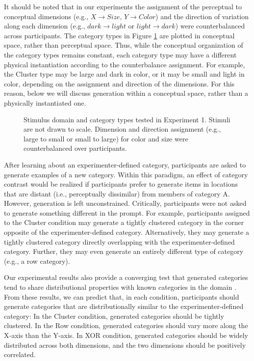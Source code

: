 \documentclass[12pt]{article}
\newcommand\inputpgf[2]{{
\let\pgfimageWithoutPath\pgfimage
\renewcommand{\pgfimage}[2][]{\pgfimageWithoutPath[##1]{#1/##2}}

}}
\begin{document}
\begin{flushleft}
It should be noted that in our experiments the assignment of the perceptual
to conceptual dimensions (e.g., $X \rightarrow Size$, $Y \rightarrow Color$) and the direction of variation along each dimension (e.g., $dark
\rightarrow light$ or $light \rightarrow dark$) were counterbalanced across
participants. The category types in Figure \ref{fig:e1-conditions} are plotted
in conceptual space, rather than perceptual space. Thus, while the
conceptual organization of the category types remains constant, each category
type may have a different physical instantiation according to the counterbalance
assignment. For example, the Cluster type may be large and dark in color, or it
may be small and light in color, depending on the assignment and direction of
the dimensions. For this reason, below we will discuss generation within a
conceptual space, rather than a physically instantiated one.

\begin{figure}
    \begin{center} \inputpgf{figs/}{e1-conditions.pgf}
    \caption{Stimulus domain and category types tested in Experiment 1. Stimuli
are not drawn to scale. Dimension and direction assignment (e.g., large to small or small to large) for color and size were counterbalanced over participants.}
    \label{fig:e1-conditions}
    \end{center}
\end{figure}

After learning about an experimenter-defined category, participants are asked to
generate examples of a new category. Within this paradigm, an effect of category
contrast would be realized if participants prefer to generate items in locations
that are distant (i.e., perceptually dissimilar) from members of category A.
However, generation is left unconstrained. Critically, participants were not
asked to generate something different in the prompt. For example, participants
assigned to the Cluster condition may generate a tightly clustered category in
the corner opposite of the experimenter-defined category. Alternatively, they
may generate a tightly clustered category directly overlapping with the
experimenter-defined category. Further, they may even generate an entirely
different type of category (e.g., a row category).

Our experimental results also provide a converging test
that generated categories tend to share distributional properties with known
categories in the domain \citep{jern2013probabilistic,ward1994structured}. From
these results, we can predict that, in each condition, participants should
generate categories that are distributionally similar to the
experimenter-defined category: In the Cluster condition, generated categories
should be tightly clustered. In the Row condition, generated categories should
vary more along the X-axis than the Y-axis. In XOR condition, generated
categories should be widely distributed across both dimensions, and the two
dimensions should be positively correlated.


\end{flushleft}
\end{document}
